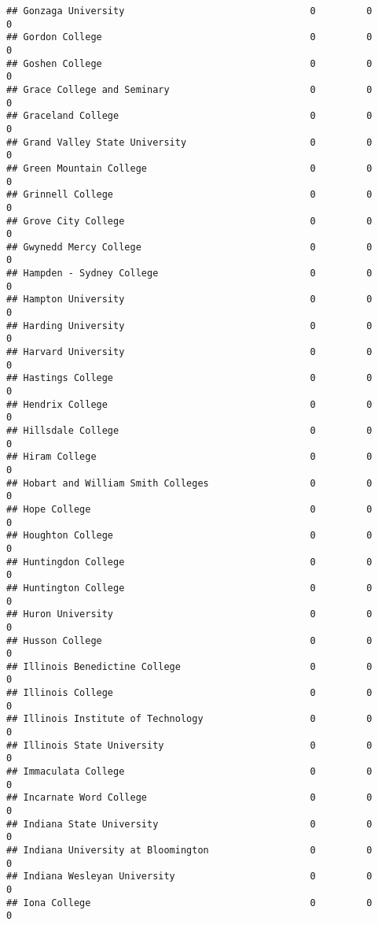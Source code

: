 \documentclass[
]{article}
\begin{document}
\begin{verbatim}
## Gonzaga University                                 0         0         0
## Gordon College                                     0         0         0
## Goshen College                                     0         0         0
## Grace College and Seminary                         0         0         0
## Graceland College                                  0         0         0
## Grand Valley State University                      0         0         0
## Green Mountain College                             0         0         0
## Grinnell College                                   0         0         0
## Grove City College                                 0         0         0
## Gwynedd Mercy College                              0         0         0
## Hampden - Sydney College                           0         0         0
## Hampton University                                 0         0         0
## Harding University                                 0         0         0
## Harvard University                                 0         0         0
## Hastings College                                   0         0         0
## Hendrix College                                    0         0         0
## Hillsdale College                                  0         0         0
## Hiram College                                      0         0         0
## Hobart and William Smith Colleges                  0         0         0
## Hope College                                       0         0         0
## Houghton College                                   0         0         0
## Huntingdon College                                 0         0         0
## Huntington College                                 0         0         0
## Huron University                                   0         0         0
## Husson College                                     0         0         0
## Illinois Benedictine College                       0         0         0
## Illinois College                                   0         0         0
## Illinois Institute of Technology                   0         0         0
## Illinois State University                          0         0         0
## Immaculata College                                 0         0         0
## Incarnate Word College                             0         0         0
## Indiana State University                           0         0         0
## Indiana University at Bloomington                  0         0         0
## Indiana Wesleyan University                        0         0         0
## Iona College                                       0         0         0

\end{verbatim}
\end{document}
